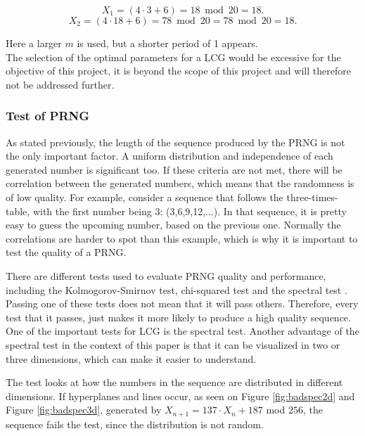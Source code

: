 \begin{equation} X_1=(4 \cdot 3 +6)=18 \bmod 20=18.\end{equation}
\begin{equation}X_2=(4 \cdot 18+6)=78 \bmod 20=78 \bmod 20=18.\end{equation}

\noindent Here a larger $m$ is used, but a shorter period of 1 appears. 
\newline \\
The selection of the optimal parameters for a LCG would be excessive for the objective of this project, it is beyond the scope of this project and will therefore not be addressed further.

\subsubsection{Test of PRNG}
As stated previously, the length of the sequence produced by the PRNG is not the only important factor. A uniform distribution and independence of each generated number is significant too. If these criteria are not met, there will be correlation between the generated numbers, which means that the randomness is of low quality. For example, consider a sequence that follows the three-times-table, with the first number being 3: (3,6,9,12,...). In that sequence, it is pretty easy to guess the upcoming number, based on the previous one. Normally the correlations are harder to spot than this example, which is why it is important to test the quality of a PRNG.
\newline

\noindent There are different tests used to evaluate PRNG quality and performance, including the Kolmogorov-Smirnov test, chi-squared test and the spectral test \cite{knuth}. Passing one of these tests does not mean that it will pass others. Therefore, every test that it passes, just makes it more likely to produce a high quality sequence. One of the important tests for LCG is the spectral test. Another advantage of the spectral test in the context of this paper is that it can be visualized in two or three dimensions, which can make it easier to understand.
\newline

\noindent The test looks at how the numbers in the sequence are distributed in different dimensions. If hyperplanes and lines occur, as seen on Figure \ref{fig:badspec2d} and Figure \ref{fig:badspec3d}, generated by $X_{n+1}=137\cdot X_{n}+187$ mod $256$, the sequence fails the test, since the distribution is not random.
\newline

